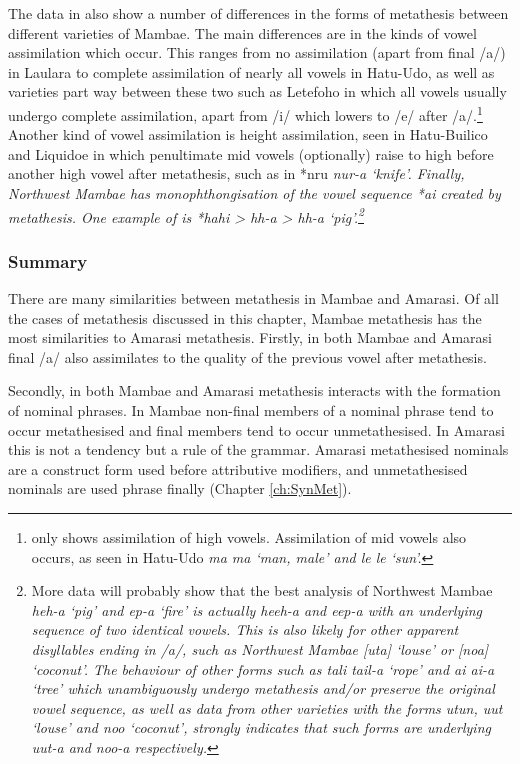 The data in  also show a number of differences
in the forms of metathesis between different varieties of Mambae.
The main differences are in the kinds of vowel assimilation which occur.
This ranges from no assimilation (apart from final /a/)
in Laulara to complete assimilation of nearly all vowels in Hatu-Udo,
as well as varieties part way between these two such as Letefoho in which
all vowels usually undergo complete assimilation,
apart from /i/ which lowers to /e/ after /a/.\footnote{
		 only shows assimilation of high vowels.
		Assimilation of mid vowels also occurs, as seen in Hatu-Udo
		\it{ma} {\ra} \it{ma} `man, male' and
		\it{le} {\ra} \it{le} `sun'.}
Another kind of vowel assimilation is
height assimilation, seen in Hatu-Builico
and Liquidoe in which penultimate mid vowels
(optionally) raise to high before another high vowel
after metathesis, such as in *nru {\ra} \it{nur-a} `knife'.
Finally, Northwest Mambae has monophthongisation
of the vowel sequence *ai created by metathesis.
One example of is *hahi > \it{hh-a} > \it{hh-a} `pig'.\footnote{
		More data will probably show that the best analysis of
		Northwest Mambae \it{heh-a} `pig' and \it{ep-a} `fire'
		is actually \it{heeh-a} and \it{eep-a} with an underlying sequence of two identical vowels.
		This is also likely for other apparent disyllables ending in /a/,
		such as Northwest Mambae [uta] `louse' or [noa] `coconut'.
		The behaviour of other forms such as \it{tali} {\ra} \it{tail-a} `rope'
		and  \it{ai} {\ra} \it{ai-a} `tree' which unambiguously undergo metathesis and/or
		preserve the original vowel sequence,
		as well as data from other varieties with the forms
		\it{utun}, \it{uut} `louse' and \it{noo} `coconut',
		strongly indicates that such forms
		are underlying \it{uut-a} and \it{noo-a} respectively.}

\subsubsection{Summary}
There are many similarities between metathesis in Mambae and Amarasi.
Of all the cases of metathesis discussed in this chapter,
Mambae metathesis has the most similarities to Amarasi metathesis.
Firstly, in both Mambae and Amarasi final /a/ also assimilates to the quality
of the previous vowel after metathesis.

Secondly, in both Mambae and Amarasi metathesis interacts
with the formation of nominal phrases.
In Mambae non-final members of a nominal phrase tend to occur metathesised
and final members tend to occur unmetathesised.
In Amarasi this is not a tendency but a rule of the grammar.
Amarasi metathesised nominals are a construct form used before attributive modifiers,
and unmetathesised nominals are used phrase finally (Chapter \ref{ch:SynMet}).

